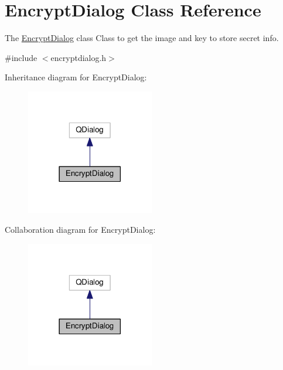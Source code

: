 \hypertarget{class_encrypt_dialog}{\section{Encrypt\-Dialog Class Reference}
\label{class_encrypt_dialog}
}


The \hyperlink{class_encrypt_dialog}{Encrypt\-Dialog} class Class to get the image and key to store secret info.  




{\ttfamily \#include $<$encryptdialog.\-h$>$}



Inheritance diagram for Encrypt\-Dialog\-:
\nopagebreak
\begin{figure}[H]
\begin{center}
\leavevmode
\includegraphics[width=158pt]{class_encrypt_dialog__inherit__graph}
\end{center}
\end{figure}


Collaboration diagram for Encrypt\-Dialog\-:
\nopagebreak
\begin{figure}[H]
\begin{center}
\leavevmode
\includegraphics[width=158pt]{class_encrypt_dialog__coll__graph}
\end{center}
\end{figure}
